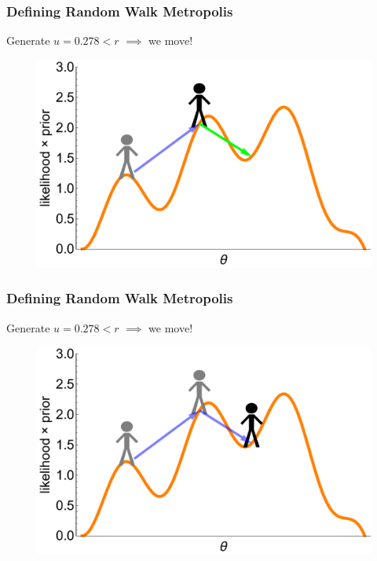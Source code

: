\documentclass[handout]{beamer}
\begin{document}
\begin{frame}
\frametitle{Defining Random Walk Metropolis}
Generate $u = 0.278 < r$ $\implies$ we move! 

\begin{figure}[ht]
\centerline{\includegraphics[width=1\textwidth]{./Figures/lec4_metropolisDefinition12.pdf}}
\end{figure}

\end{frame}

\begin{frame}
\frametitle{Defining Random Walk Metropolis}
Generate $u = 0.278 < r$ $\implies$ we move! 

\begin{figure}[ht]
\centerline{\includegraphics[width=1\textwidth]{./Figures/lec4_metropolisDefinition13.pdf}}
\end{figure}

\end{frame}
\end{document}

